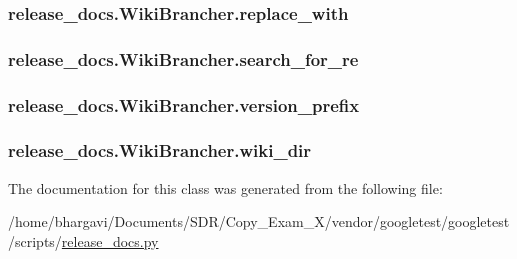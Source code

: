 \subsubsection[{\texorpdfstring{replace\+\_\+with}{replace_with}}]{\setlength{\rightskip}{0pt plus 5cm}release\+\_\+docs.\+Wiki\+Brancher.\+replace\+\_\+with}\hypertarget{classrelease__docs_1_1_wiki_brancher_aa33d991e629cc94fbfefe4f8569e283e}{}\label{classrelease__docs_1_1_wiki_brancher_aa33d991e629cc94fbfefe4f8569e283e}
\subsubsection[{\texorpdfstring{search\+\_\+for\+\_\+re}{search_for_re}}]{\setlength{\rightskip}{0pt plus 5cm}release\+\_\+docs.\+Wiki\+Brancher.\+search\+\_\+for\+\_\+re}\hypertarget{classrelease__docs_1_1_wiki_brancher_a029ce9007fefd6ac5f13bacdedb29af5}{}\label{classrelease__docs_1_1_wiki_brancher_a029ce9007fefd6ac5f13bacdedb29af5}
\subsubsection[{\texorpdfstring{version\+\_\+prefix}{version_prefix}}]{\setlength{\rightskip}{0pt plus 5cm}release\+\_\+docs.\+Wiki\+Brancher.\+version\+\_\+prefix}\hypertarget{classrelease__docs_1_1_wiki_brancher_aae330aeef850b105795c5d75727448ba}{}\label{classrelease__docs_1_1_wiki_brancher_aae330aeef850b105795c5d75727448ba}
\subsubsection[{\texorpdfstring{wiki\+\_\+dir}{wiki_dir}}]{\setlength{\rightskip}{0pt plus 5cm}release\+\_\+docs.\+Wiki\+Brancher.\+wiki\+\_\+dir}\hypertarget{classrelease__docs_1_1_wiki_brancher_ad86478c9538ac0bf3916f67eb5da2910}{}\label{classrelease__docs_1_1_wiki_brancher_ad86478c9538ac0bf3916f67eb5da2910}


The documentation for this class was generated from the following file\+:\begin{DoxyCompactItemize}
\item 
/home/bhargavi/\+Documents/\+S\+D\+R/\+Copy\+\_\+\+Exam\+\_\+X/vendor/googletest/googletest/scripts/\hyperlink{release__docs_8py}{release\+\_\+docs.\+py}\end{DoxyCompactItemize}
